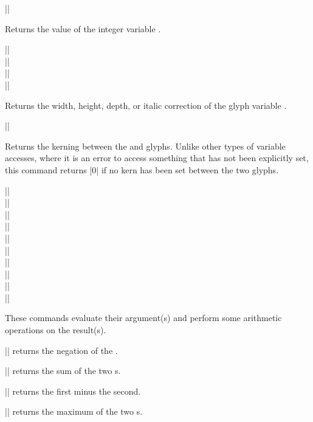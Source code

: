 \documentclass[a4paper]{ltxguide}
\begin{document}
\begin{decl}
  |\int|
\end{decl}
Returns the value of the integer variable .

\begin{decl}
  |\width|\\
  |\height|\\
  |\depth|\\
  |\italic|
\end{decl}
Returns the width, height, depth, or italic correction of the glyph
variable .

\begin{decl}
  ||
\end{decl}
Returns the kerning between the  and  glyphs. Unlike 
other types of variable accesses, where it is an error to access 
something that has not been explicitly set, this command returns |0| 
if no kern has been set between the two glyphs.

\begin{decl}
  |\neg|\\
  |\add|\\
  |\sub|\\
  |\max|\\
  |\min|\\
  |\mul|\\
  |\div|\\
  |\scale|\\
  |\half|\\
  |\otherhalf|
\end{decl}
These commands evaluate their argument(s) and perform some arithmetic 
operations on the result(s).

|\neg| returns the negation of the .

|\add| returns the sum of the two s.

|\sub| returns the first  minus the second.

|\max| returns the maximum of the two s.
\end{document}
